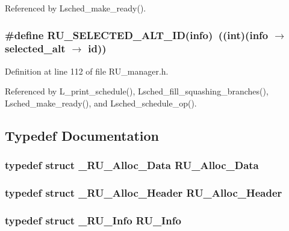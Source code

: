 Referenced by Lsched\_\-make\_\-ready().
\subsubsection{\setlength{\rightskip}{0pt plus 5cm}\#define RU\_\-SELECTED\_\-ALT\_\-ID(info)~((int)(info $\rightarrow$ selected\_\-alt $\rightarrow$ id))}\label{RU__manager_8h_2dd1e8e937302f3ae977f35fd78b53e7}




Definition at line 112 of file RU\_\-manager.h.

Referenced by L\_\-print\_\-schedule(), Lsched\_\-fill\_\-squashing\_\-branches(), Lsched\_\-make\_\-ready(), and Lsched\_\-schedule\_\-op().

\subsection{Typedef Documentation}
\subsubsection{\setlength{\rightskip}{0pt plus 5cm}typedef struct \bf{\_\-RU\_\-Alloc\_\-Data}  \bf{RU\_\-Alloc\_\-Data}}\label{RU__manager_8h_7651c76e9739872d39b42a582d564b67}


\subsubsection{\setlength{\rightskip}{0pt plus 5cm}typedef struct \bf{\_\-RU\_\-Alloc\_\-Header}  \bf{RU\_\-Alloc\_\-Header}}\label{RU__manager_8h_d54fb6ddaf8dca24010220cd8b35fa76}


\subsubsection{\setlength{\rightskip}{0pt plus 5cm}typedef struct \bf{\_\-RU\_\-Info}  \bf{RU\_\-Info}}\label{RU__manager_8h_fdd3a5337864c0ce9db4a5b2382ff64a}


